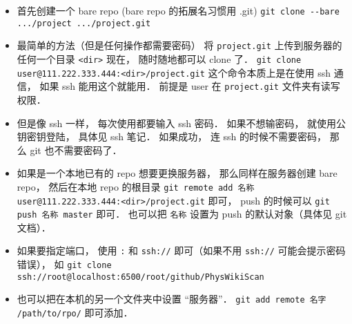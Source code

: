 
\begin{issues}
\issueDraft
\end{issues}


\begin{itemize}
\item 首先创建一个 bare repo (bare repo 的拓展名习惯用 .git)
\verb|git clone --bare .../project .../project.git|

\item 最简单的方法（但是任何操作都需要密码）
将 \verb|project.git| 上传到服务器的任何一个目录 \verb|<dir>|
现在， 随时随地都可以 clone 了．
\verb`git clone user@111.222.333.444:<dir>/project.git`
这个命令本质上是在使用 ssh 通信， 如果 ssh 能用这个就能用．
前提是 user 在 \verb|project.git| 文件夹有读写权限．

\item 但是像 ssh 一样， 每次使用都要输入 ssh 密码． 如果不想输密码， 就使用公钥密钥登陆， 具体见 ssh 笔记． 如果成功， 连 ssh 的时候不需要密码， 那么 git 也不需要密码了．

\item 如果是一个本地已有的 repo 想要更换服务器， 那么同样在服务器创建 bare repo， 然后在本地 repo 的根目录 \verb`git remote add 名称 user@111.222.333.444:<dir>/project.git` 即可， push 的时候可以 \verb`git push 名称 master` 即可． 也可以把 \verb`名称` 设置为 push 的默认对象（具体见 git 文档）．

\item 如果要指定端口， 使用 \verb`:` 和 \verb`ssh://` 即可（如果不用 \verb`ssh://` 可能会提示密码错误）， 如 \verb`git clone ssh://root@localhost:6500/root/github/PhysWikiScan`

\item 也可以把在本机的另一个文件夹中设置 “服务器”． \verb|git add remote 名字 /path/to/rpo/| 即可添加．
\end{itemize}

